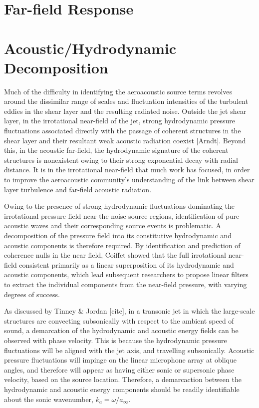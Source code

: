 \section{Far-field Response}
\section{Acoustic/Hydrodynamic Decomposition}
Much of the difficulty in identifying the aeroacoustic source terms revolves around the dissimilar range of scales and fluctuation intensities of the turbulent eddies in the shear layer and the resulting radiated noise. 
Outside the jet shear layer, in the irrotational near-field of the jet, strong hydrodynamic pressure fluctuations associated directly with the passage of coherent structures in the shear layer and their resultant weak acoustic radiation coexist [Arndt]. 
Beyond this, in the acoustic far-field, the hydrodynamic signature of the coherent structures is nonexistent owing to their strong exponential decay with radial distance.
It is in the irrotational near-field that much work has focused, in order to improve the aeroacoustic community's understanding of the link between shear layer turbulence and far-field acoustic radiation. 

Owing to the presence of strong hydrodynamic fluctuations dominating the irrotational pressure field near the noise source regions, identification of pure acoustic waves and their corresponding source events is problematic.
A decomposition of the pressure field into its constitutive hydrodynamic and acoustic components is therefore required. 
By identification and prediction of coherence nulls in the near field, Coiffet \etal [cite] showed that the full irrotational near-field consistent primarily as a linear superposition of its hydrodynamic and acoustic components, which lead subsequent researchers to propose linear filters to extract the individual components from the near-field pressure, with varying degrees of success. 

As discussed by Tinney \& Jordan [cite], in a transonic jet in which the large-scale structures are convecting subsonically with respect to the ambient speed of sound, a demarcation of the hydrodynamic and acoustic energy fields can be observed with phase velocity.
This is because the hydrodynamic pressure fluctuations will be aligned with the jet axis, and travelling subsonically. 
Acoustic pressure fluctuations will impinge on the linear microphone array at oblique angles, and therefore will appear as having either sonic or supersonic phase velocity, based on the source location. 
Therefore, a demarcaction between the hydrodynamic and acoustic energy components should be readily identifiable about the sonic wavenumber, $k_a = \omega / a_\infty$.

